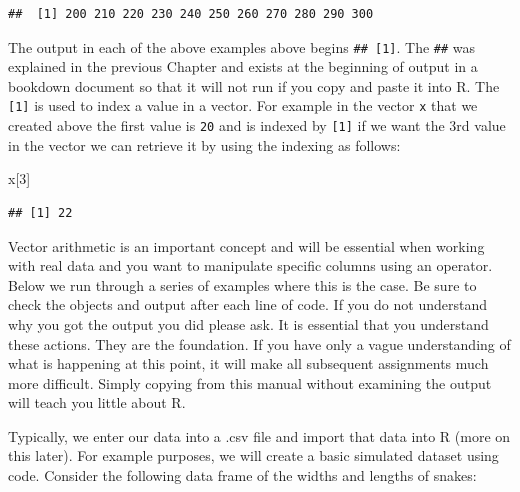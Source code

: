 \documentclass[
]{book}
\newenvironment{Shaded}{\begin{snugshade}}{\end{snugshade}}
\newcommand{\DecValTok}[1]{\textcolor[rgb]{0.00,0.00,0.81}{#1}}
\newcommand{\NormalTok}[1]{#1}
\begin{document}
\begin{verbatim}
##  [1] 200 210 220 230 240 250 260 270 280 290 300
\end{verbatim}

The output in each of the above examples above begins \texttt{\#\#\ {[}1{]}}. The \texttt{\#\#} was explained in the previous Chapter and exists at the beginning of output in a bookdown document so that it will not run if you copy and paste it into R. The \texttt{{[}1{]}} is used to index a value in a vector. For example in the vector \texttt{x} that we created above the first value is \texttt{20} and is indexed by \texttt{{[}1{]}} if we want the 3rd value in the vector we can retrieve it by using the indexing as follows:

\begin{Shaded}
\begin{Highlighting}[]
\NormalTok{x[}\DecValTok{3}\NormalTok{]}
\end{Highlighting}
\end{Shaded}

\begin{verbatim}
## [1] 22
\end{verbatim}

Vector arithmetic is an important concept and will be essential when working with real data and you want to manipulate specific columns using an operator. Below we run through a series of examples where this is the case. Be sure to check the objects and output after each line of code. If you do not understand why you got the output you did please ask. It is essential that you understand these actions. They are the foundation. If you have only a vague understanding of what is happening at this point, it will make all subsequent assignments much more difficult. Simply copying from this manual without examining the output will teach you little about R.

Typically, we enter our data into a .csv file and import that data into R (more on this later). For example purposes, we will create a basic simulated dataset using code. Consider the following data frame of the widths and lengths of snakes:
\end{document}
